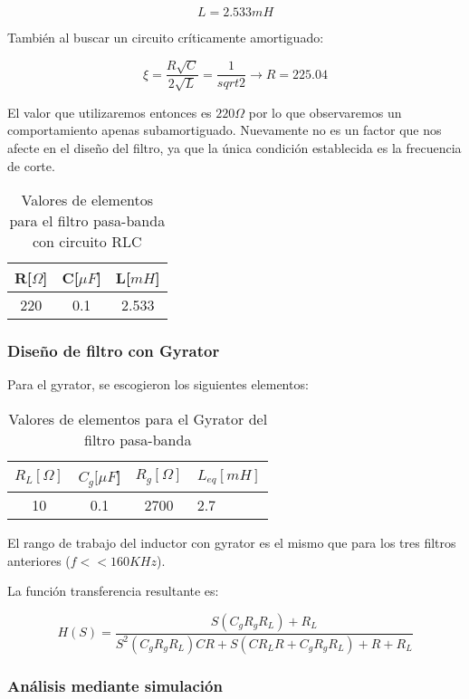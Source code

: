 $$L = 2.533 mH$$

También al buscar un circuito críticamente amortiguado:

$$\xi=\frac{R \sqrt{C}}{2\sqrt{L}}=\frac{1}{sqrt{2}} \longrightarrow R=225.04$$

El valor que utilizaremos entonces es $220 \Omega$ por lo que observaremos un comportamiento apenas subamortiguado.
Nuevamente no es un factor que nos afecte en el diseño del filtro, ya que la única condición establecida es la frecuencia
de corte.

\begin{table}[H]
    \centering
    \begin{tabular}{|c|c|c|}
    \hline
    \rowcolor[HTML]{C0C0C0} 
    R[$\Omega$] & C[$\mu F$] & L[$mH$]  \\ \hline
    220     & 0.1  & 2.533 \\ \hline
    \end{tabular}
    \caption{Valores de elementos para el filtro pasa-banda con circuito RLC}
    \end{table}

\subsubsection{Diseño de filtro con Gyrator}

Para el gyrator, se escogieron los siguientes elementos:

\begin{table}[H]
    \centering
    \begin{tabular}{|c|c|c|l|}
    \hline
    \rowcolor[HTML]{C0C0C0} 
    $R_L[\Omega]$ & $C_g[\mu F$] & $R_g[\Omega]$  & $L_{eq}[mH]$ \\ \hline
    10      & 0.1  & 2700 & 2.7        \\ \hline
    \end{tabular}
    \caption{Valores de elementos para el Gyrator del filtro pasa-banda}
    \end{table}

El rango de trabajo del inductor con gyrator es el mismo que para los tres filtros anteriores ($ f << 160 KHz$).

La función transferencia resultante es:

$$H(S)=\frac{S(C_gR_gR_L) + R_L}{S^2(C_gR_gR_L)CR+S(CR_LR+C_gR_gR_L)+R+R_L}$$

\subsubsection{Análisis mediante simulación}


